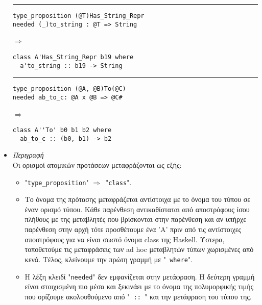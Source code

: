 \documentclass[diploma]{softlab-thesis}
\def\H{Haskell}
\def\lra{$\Longrightarrow$\ }
\begin{document}
\begin{itemize}
\begin{minipage}{0.40\linewidth}
\rule{\linewidth}{0.1pt}

\begin{verbatim}
type_proposition (@T)Has_String_Repr
needed (_)to_string : @T => String
\end{verbatim}

\lra

\begin{verbatim}
class A'Has_String_Repr b19 where
  a'to_string :: b19 -> String
\end{verbatim}

\rule{\linewidth}{0.1pt}

\begin{verbatim}
type_proposition (@A, @B)To(@C)
needed ab_to_c: @A x @B => @C#
\end{verbatim}

\lra

\begin{verbatim}
class A''To' b0 b1 b2 where
  ab_to_c :: (b0, b1) -> b2
\end{verbatim}

\end{minipage}

\item
\textit{Περιγραφή}\\

Οι ορισμοί ατομικών προτάσεων μεταφράζονται ως εξής:

\begin{itemize}

\item
"\texttt{type_proposition}" \lra "\texttt{class}".

\item
Το όνομα της πρότασης μεταφράζεται αντίστοιχα με το όνομα του τύπου σε έναν
ορισμό τύπου.  Κάθε παρένθεση αντικαθίσταται από αποστρόφους ίσου πλήθους με
της μεταβλητές που βρίσκονται στην παρένθεση και αν υπήρχε παρένθεση στην
αρχή τότε προσθέτουμε ένα 'A' πριν από τις αντίστοιχες αποστρόφους για
να είναι σωστό όνομα class της \H. Ύστερα, τοποθετούμε τις μεταφράσεις
των ad hoc μεταβλητών τύπων χωρισμένες από κενά. Τέλος, κλείνουμε την πρώτη
γραμμή με "\texttt{ where}".

\item
Η λέξη κλειδί "\texttt{needed}" δεν εμφανίζεται στην μετάφραση. Η δεύτερη
γραμμή είναι στοιχισμένη πιο μέσα και ξεκινάει με το όνομα της πολυμορφικής
τιμής που ορίζουμε ακολουθούμενο από "\verb| :: |" και την μετάφραση του
τύπου της.

\end{itemize}

\end{itemize}
\end{document}
